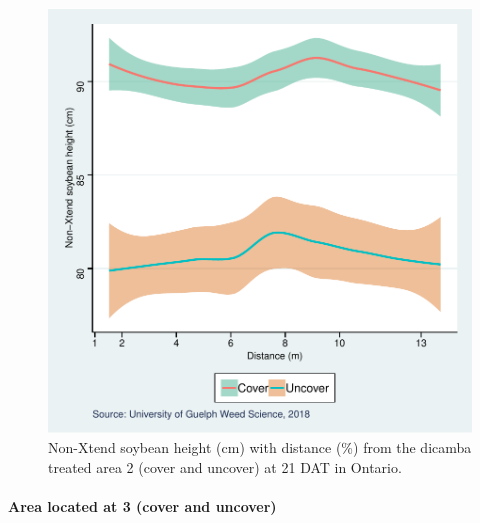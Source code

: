 \documentclass[]{article}
\let\oldparagraph\paragraph
\renewcommand{\paragraph}[1]{\oldparagraph{#1}\mbox{}}
\begin{document}
\begin{figure}
\centering
\includegraphics{Report_files/figure-latex/unnamed-chunk-91-1.pdf}
\caption{Non-Xtend soybean height (cm) with distance (\%) from the
dicamba treated area 2 (cover and uncover) at 21 DAT in Ontario.}
\end{figure}

\newpage

\pagebreak

\paragraph{Area located at 3 (cover and
uncover)}\label{area-located-at-3-cover-and-uncover-1}
\end{document}
